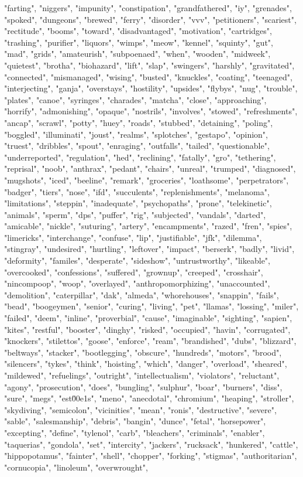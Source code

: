 "farting", "niggers", "impunity", "constipation", "grandfathered", "iy", "grenades", "spoked", "dungeons", "brewed", "ferry", "disorder", "vvv", "petitioners", "scariest", "rectitude", "booms", "toward", "disadvantaged", "motivation", "cartridges", "trashing", "purifier", "liquors", "wimps", "meow", "kennel", "squinty", "gut", "mad", "grids", "amateurish", "subpoenaed", "when", "wooden", "midweek", "quietest", "brotha", "biohazard", "lift", "slap", "swingers", "harshly", "gravitated", "connected", "mismanaged", "wising", "busted", "knuckles", "coating", "teenaged", "interjecting", "ganja", "overstays", "hostility", "upsides", "flybys", "nug", "trouble", "plates", "canoe", "syringes", "charades", "matcha", "close", "approaching", "horrify", "admonishing", "opaque", "nostrils", "involves", "stowed", "refreshments", "ancap", "scrawl", "potty", "huey", "roads", "stubbed", "detaining", "poling", "boggled", "illuminati", "joust", "realms", "splotches", "gestapo", "opinion", "truest", "dribbles", "spout", "enraging", "outfalls", "tailed", "questionable", "underreported", "regulation", "hed", "reclining", "fatally", "gro", "tethering", "reprisal", "noob", "anthrax", "pedant", "chairs", "unreal", "trumped", "diagnosed", "mugshots", "iced", "beeline", "remark", "groceries", "loathsome", "perpetrators", "badger", "tiers", "nose", "ifd", "succulents", "replenishments", "melanoma", "limitations", "steppin", "inadequate", "psychopaths", "prone", "telekinetic", "animals", "sperm", "dps", "puffer", "rig", "subjected", "vandals", "darted", "amicable", "nickle", "suturing", "artery", "encampments", "razed", "fren", "spies", "limericks", "interchange", "confuse", "lip", "justifiable", "jfk", "dilemma", "stingray", "undesired", "hurtling", "leftover", "impact", "berserk", "badly", "livid", "deformity", "familes", "desperate", "sideshow", "untrustworthy", "likeable", "overcooked", "confessions", "suffered", "grownup", "creeped", "crosshair", "nincompoop", "woop", "overlayed", "anthropomorphizing", "unaccounted", "demolition", "caterpillar", "dak", "almeda", "whorehouses", "snappin", "fails", "bead", "boogeymen", "senior", "curing", "living", "pet", "llamas", "lossing", "miler", "failed", "deem", "inline", "proverbial", "cause", "imaginable", "sighting", "sapien", "kites", "restful", "booster", "dinghy", "risked", "occupied", "havin", "corrugated", "knockers", "stilettos", "goose", "enforce", "ream", "brandished", "dubs", "blizzard", "beltways", "stacker", "bootlegging", "obscure", "hundreds", "motors", "brood", "silencers", "tykes", "think", "hoisting", "which", "danger", "overload", "sheared", "mildewed", "refuelings", "outright", "intellectualism", "violators", "reluctant", "agony", "prosecution", "does", "bungling", "sulphur", "boar", "burners", "diss", "sure", "megs", "est\u00e1s", "meno", "anecdotal", "chromium", "heaping", "stroller", "skydiving", "semicolon", "vicinities", "mean", "ronis", "destructive", "severe", "sable", "salesmanship", "debris", "bangin", "dunce", "fetal", "horsepower", "excepting", "define", "tylenol", "carb", "bleachers", "criminals", "enabler", "taquerias", "gondola", "set", "intercity", "jackers", "rucksack", "hunkered", "cattle", "hippopotamus", "fainter", "shell", "chopper", "forking", "stigmas", "authoritarian", "cornucopia", "linoleum", "overwrought", 